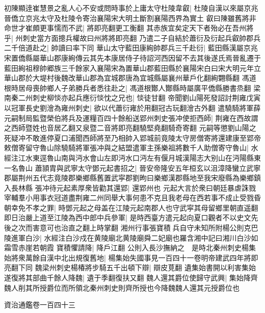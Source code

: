 初陳顯逹崔慧景之亂人心不安或問時事於上庸太守杜陵韋叡|{
	杜陵自漢以來屬京兆晉僑立京兆太守及杜陵令寄治襄陽宋大明土斷割襄陽西界為實土}
叡曰陳雖舊將非命世才崔頗更事懦而不武|{
	將即亮翻更工衡翻}
其赤族宜矣定天下者殆必在吾州將乎|{
	州刺史當方面摠兵權故曰州將將即亮翻}
乃遣二子自結於蕭衍及衍起兵叡帥郡兵二千倍道赴之|{
	帥讀曰率下同}
華山太守藍田康絢帥郡兵三千赴衍|{
	藍田縣漢屬京兆宋置僑縣屬華山郡康絢傳云其先本康居侍子待詔河西因留不去其後遂氏焉晉亂遷于藍田絢祖穆帥郷族三千餘家入襄陽宋為置華山郡藍田縣於襄陽宋白曰宋大明元年立華山郡於大堤村後魏改華山郡為宜城郡唐為宜城縣屬襄州華戶化翻絢翾縣翻}
馮道根時居母喪帥鄉人子弟勝兵者悉往赴之|{
	馮道根酇人酇縣時屬廣平僑縣勝書烝翻}
梁南秦二州刺史柳惔亦起兵應衍惔忱之兄也|{
	惔徒甘翻}
帝聞劉山陽死發詔討荆雍戊寅以冠軍長史劉澮為雍州刺史|{
	欲以代蕭衍雍於用翻冠古玩翻澮古外翻}
遣驍騎將軍薛元嗣制局監暨榮伯將兵及運糧百四十餘船送郢州刺史張冲使拒西師|{
	荆雍在西故謂之西師暨姓也音居乙翻又泉暨二音將即亮翻驍堅堯翻騎奇寄翻}
元嗣等懲劉山陽之死疑冲不敢進停夏口浦聞西師將至乃相帥入郢城前竟陵太守房僧寄將還建康至郢帝敕僧寄留守魯山除驍騎將軍張冲與之結盟遣軍主孫樂祖將數千人助僧寄守魯山|{
	水經注江水東逕魯山南與沔水會山左即沔水口沔左有偃月城漢陽志大别山在沔陽縣東一名魯山}
蕭頴胄與武寧太守鄧元起書招之|{
	晉安帝隆安五年桓玄以沮漳降蠻立武寧郡屬荆州五代志竟陵郡樂鄉縣舊置武寜郡劉昫曰樂鄉漢郡縣地至我宋廢縣為樂鄉鎮入長林縣}
張冲待元起素厚衆皆勸其還郢|{
	還郢州也}
元起大言於衆曰朝廷暴虐誅戮宰輔羣小用事衣冠道盡荆雍二州同舉大事何患不克且我老母在西若事不成止受戮昏朝幸免不孝之罪|{
	時鄧元起之母盖在江陵元起南郡人也守武寜其母留鄉里朝直遥翻}
即日治嚴上道至江陵為西中郎中兵參軍|{
	是時西臺方遣元起向夏口觀者不以史文先後之次而害意可也治直之翻上時掌翻}
湘州行事張寶積兵自守未知所附楊公則克巴陵進軍白沙|{
	水經注白沙戍在黄陵廟北黄陵廟舜二妃廟也羅含湘中記曰湘川白沙如霜雪赤崖若朝霞}
寶積懼請降|{
	降戶江翻}
公則入長沙撫納之　是時北秦州刺史楊集始將衆萬餘自漢中北出規復舊地|{
	楊集始失國事見一百四十一卷明帝建武四年將即亮翻下同}
魏梁州刺史楊椿將步騎五千出頓下辯|{
	辯皮莧翻}
遺集始書開以利害集始遂復將其部曲千餘人降魏|{
	遺于季翻復扶又翻}
魏人還其爵位使歸守武興|{
	集始降齊魏人削其所授爵位而所領北秦州刺史則齊所授也今降魏魏人還其元授爵位也}


資治通鑑卷一百四十三
